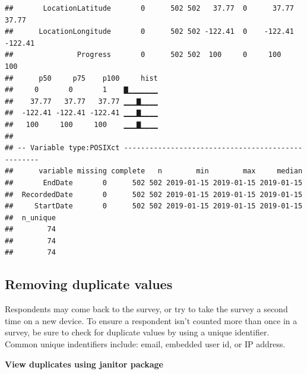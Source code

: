 \documentclass[]{book}
\newenvironment{Shaded}{\begin{snugshade}}{\end{snugshade}}
\newcommand{\CommentTok}[1]{\textcolor[rgb]{0.56,0.35,0.01}{\textit{#1}}}
\newcommand{\KeywordTok}[1]{\textcolor[rgb]{0.13,0.29,0.53}{\textbf{#1}}}
\newcommand{\NormalTok}[1]{#1}
\newcommand{\OperatorTok}[1]{\textcolor[rgb]{0.81,0.36,0.00}{\textbf{#1}}}
\newcommand{\StringTok}[1]{\textcolor[rgb]{0.31,0.60,0.02}{#1}}
\begin{document}
\begin{verbatim}
##       LocationLatitude       0      502 502   37.77  0      37.77   37.77
##      LocationLongitude       0      502 502 -122.41  0    -122.41 -122.41
##               Progress       0      502 502  100     0     100     100   
##      p50     p75    p100     hist
##     0       0       1    ▇▁▁▁▁▁▁▁
##    37.77   37.77   37.77 ▁▁▁▇▁▁▁▁
##  -122.41 -122.41 -122.41 ▁▁▁▇▁▁▁▁
##   100     100     100    ▁▁▁▇▁▁▁▁
## 
## -- Variable type:POSIXct --------------------------------------------------
##      variable missing complete   n        min        max     median
##       EndDate       0      502 502 2019-01-15 2019-01-15 2019-01-15
##  RecordedDate       0      502 502 2019-01-15 2019-01-15 2019-01-15
##     StartDate       0      502 502 2019-01-15 2019-01-15 2019-01-15
##  n_unique
##        74
##        74
##        74
\end{verbatim}

\hypertarget{removing-duplicate-values}{%
\subsection{Removing duplicate values}\label{removing-duplicate-values}}

Respondents may come back to the survey, or try to take the survey a second time on a new device. To ensure a respondent isn't counted more than once in a survey, be sure to check for duplicate values by using a unique identifier. Common unique indentifiers include: email, embedded user id, or IP address.

\textbf{View duplicates using janitor package}

\begin{Shaded}
\end{Shaded}
\end{document}
